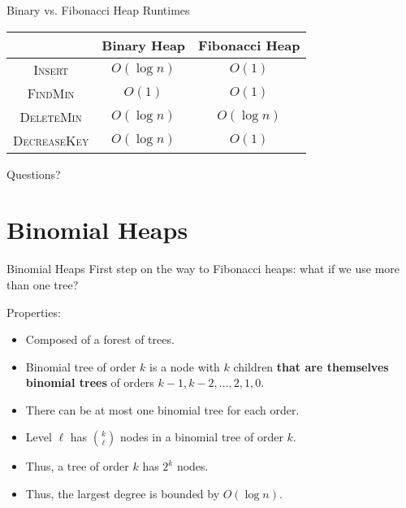 \documentclass[aspectratio=169]{beamer}
\begin{document}
\begin{frame}{Binary vs. Fibonacci Heap Runtimes}
    \begin{center}
        \begin{tabular}{|c|c|c|}
            \hline
            & Binary Heap & Fibonacci Heap \\
            \hline
            \textsc{Insert} & \textcolor{sigma@mainblue}{$O(\log n)$} & \textcolor{sigma@mainblue}{$O(1)$} \\
            \textsc{FindMin} & \textcolor{sigma@mainblue}{$O(1)$} & \textcolor{sigma@mainblue}{$O(1)$}\\
            \textsc{DeleteMin} & \textcolor{sigma@mainblue}{$O(\log n)$} & \textcolor{sigma@mainblue}{$O(\log n)$} \\
            \textsc{DecreaseKey} & \textcolor{sigma@mainblue}{$O(\log n)$} & \textcolor{sigma@mainblue}{$O(1)$} \\
            \hline
        \end{tabular}
    \end{center}
\end{frame}


\begin{frame}{}
      \begin{center}
    {\color{sigma@mainblue} \LARGE Questions?}
  \end{center}
\end{frame}


\section{Binomial Heaps}
\frame{\sectionpage}

\begin{frame}{Binomial Heaps}
    First step on the way to Fibonacci heaps: what if we use more than one tree?\pause
    
    Properties:
    \begin{itemize}
        \item Composed of a forest of trees.\pause
        \item Binomial tree of order $k$ is a node with $k$ children \textbf{that are themselves binomial trees} of orders $k - 1, k - 2, \ldots, 2, 1, 0$.\pause
        \item There can be at most one binomial tree for each order.\pause
        \item Level $\ell$ has $\binom{k}{\ell}$ nodes in a binomial tree of order $k$.\pause
        \item Thus, a tree of order $k$ has $2^k$ nodes.\pause
        \item Thus, the largest degree is bounded by \textcolor{sigma@mainblue}{$O(\log n)$}.
    \end{itemize}
\end{frame}
\end{document}
